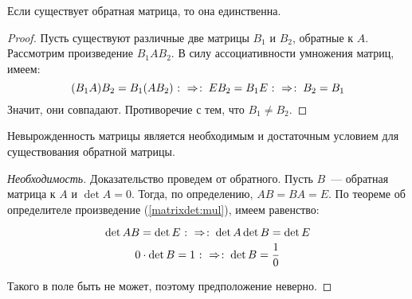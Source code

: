 
\begin{theorem}
	Если существует обратная матрица, то она единственна.
\end{theorem}
\begin{proof}
	Пусть существуют различные две матрицы $B_1$ и $B_2$, обратные к $A$.
	Рассмотрим произведение $B_1AB_2$. В силу ассоциативности умножения
	матриц, имеем:
	$$(B_1A)B_2=B_1(AB_2) \mathbin{\colon\Rightarrow \colon} EB_2=B_1E \mathbin{\colon\Rightarrow \colon} B_2=B_1$$
	Значит, они совпадают. Противоречие с тем, что $B_1\ne B_2$.
\end{proof}

\begin{theorem}
	Невырожденность матрицы является необходимым и достаточным условием
	для существования обратной матрицы.
\end{theorem}
\begin{proof}[Необходимость]
	Доказательство проведем от обратного. Пусть $B$~--- обратная
	матрица к $A$ и $\det A=0$. Тогда, по определению, $AB=BA=E$. По теореме об
	определителе произведение (\ref{matrixdet:mul}), имеем равенство:

	$$\det AB=\det E \mathbin{\colon\Rightarrow \colon} \det A\det B=\det E$$
	$$0\cdot\det B=1 \mathbin{\colon\Rightarrow \colon} \det B=\frac10$$

	Такого в поле быть не может, поэтому предположение неверно.
\end{proof}
